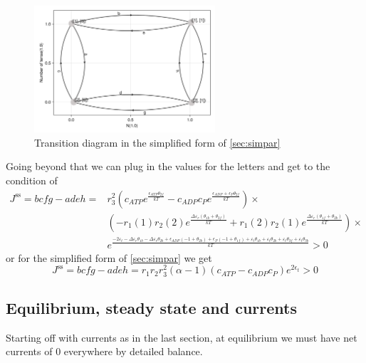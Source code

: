 \documentclass[11pt]{article}
\begin{document}
\begin{figure}[H]
    \centering
    \includegraphics[width=0.6\textwidth]{../../plots/symalph_B=1_C=2_N=1_version=2.5.png}
    \caption{
        Transition diagram in the simplified form of \cref{sec:simpar}
    }\label{fig:N1symalph}
\end{figure}

Going beyond that we can plug in the values for the letters and get to the condition of
\begin{align}
    J^\text{ss}=bcfg-adeh = &r_3^{2} \left( c_{ATP} e^{\frac{\epsilon_{ATP} \theta_{2f}}{kT}} - c_{ADP} c_P e^{\frac{\epsilon_{ADP} + \epsilon_P \theta_{2f}}{kT}} \right) \times \\
    &\left(  - r_{1}(1) r_{2}(2) e^{\frac{\Delta\varepsilon_{r} \left( \theta_{1b} + \theta_{2f} \right)}{kT}} + r_{1}(2) r_{2}(1) e^{\frac{\Delta\varepsilon_{r} \left( \theta_{1f} + \theta_{2b} \right)}{kT}} \right) \times \\
    &e^{\frac{ - 2 \varepsilon_{t} - \Delta\varepsilon_{r} \theta_{1b} - \Delta\varepsilon_{r} \theta_{2b} + \epsilon_{ADP} \left( -1 + \theta_{2b} \right) + \epsilon_P \left( -1 + \theta_{1f} \right) + \varepsilon_{t} \theta_{1b} + \varepsilon_{t} \theta_{2b} + \varepsilon_{t} \theta_{3f} + \varepsilon_{t} \theta_{3b}}{kT}} > 0
\end{align}
or for the simplified form of \cref{sec:simpar} we get
\begin{equation}
    J^\text{ss} = bcfg-adeh = r_1r_2r_3^{2} (\alpha - 1) \left( c_{ATP} - c_{ADP} c_P \right) e^{2 \epsilon_t} > 0
\end{equation}

\subsection{Equilibrium, steady state and currents}
Starting off with currents as in the last section, at equilibrium we must have net currents of 0 everywhere by detailed balance.
\end{document}
